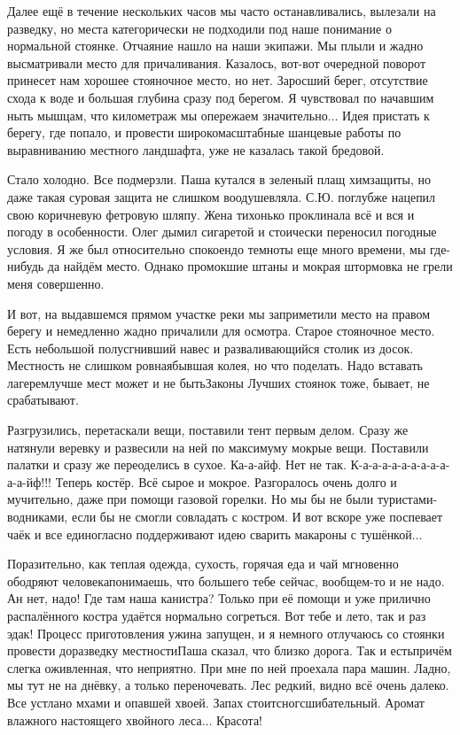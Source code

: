 Далее ещё в течение нескольких часов мы часто останавливались, вылезали на разведку, но места категорически не подходили под наше понимание о нормальной стоянке. Отчаяние нашло на наши экипажи. Мы плыли и жадно высматривали место для причаливания. Казалось, вот-вот очередной поворот принесет нам хорошее стояночное место, но нет. Заросший берег, отсутствие схода к воде и большая глубина сразу под берегом. Я чувствовал по начавшим ныть мышцам, что километраж мы опережаем значительно$\ldots$ Идея пристать к берегу, где попало, и провести широкомасштабные шанцевые работы по выравниванию местного ландшафта, уже не казалась такой бредовой.

Стало холодно. Все подмерзли. Паша кутался в зеленый плащ химзащиты, но даже такая суровая защита не слишком воодушевляла. С.Ю. поглубже нацепил свою коричневую фетровую шляпу. Жена тихонько проклинала всё и вся и погоду в особенности. Олег дымил сигаретой и стоически переносил погодные условия. Я же был относительно спокоен\mdash до темноты еще много времени, мы где-нибудь да найдём место. Однако промокшие штаны и мокрая штормовка не грели меня совершенно.

И вот, на выдавшемся прямом участке реки мы заприметили место на правом берегу и немедленно жадно причалили для осмотра. Старое стояночное место. Есть небольшой полусгнивший навес и разваливающийся столик из досок. Местность не слишком ровная\mdash бывшая колея, но что поделать. Надо вставать лагерем\mdash лучше мест может и не быть\mdash Законы Лучших стоянок тоже, бывает, не срабатывают.

Разгрузились, перетаскали вещи, поставили тент первым делом. Сразу же натянули веревку и развесили на ней по максимуму мокрые вещи. Поставили палатки и сразу же переоделись в сухое. Ка-а-айф. Нет не так. К-а-а-а-а-а-а-а-а-а-а-а-йф!!! Теперь костёр. Всё сырое и мокрое. Разгоралось очень долго и мучительно, даже при помощи газовой горелки. Но мы бы не были туристами-водниками, если бы не смогли совладать с костром. И вот вскоре уже поспевает чаёк и все единогласно поддерживают идею сварить макароны с тушёнкой$\ldots$

Поразительно, как теплая одежда, сухость, горячая еда и чай мгновенно ободряют человека\mdash понимаешь, что большего тебе сейчас, вообщем-то и не надо. Ан нет, надо! Где там наша канистра? Только при её помощи и уже прилично распалённого костра удаётся нормально согреться. Вот тебе и лето, так и раз эдак!  
Процесс приготовления ужина запущен, и я немного отлучаюсь со стоянки провести доразведку местности\mdash Паша сказал, что близко дорога. Так и есть\mdash причём слегка оживленная, что неприятно. При мне по ней проехала пара машин. Ладно, мы тут не на днёвку, а только переночевать. Лес редкий, видно всё очень далеко. Все устлано мхами и опавшей хвоей. Запах стоит\mdash сногсшибательный. Аромат влажного настоящего хвойного леса$\ldots$ Красота!

